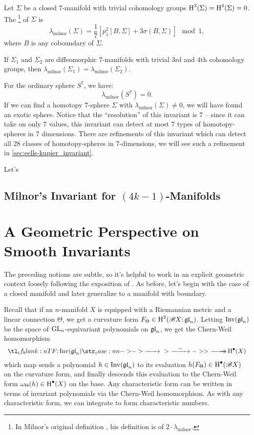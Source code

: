 \begin{definition}
  Let $\Sigma$ be a closed $7$-manifold with trivial cohomology groups $\operatorname{H}^3(\Sigma)=\operatorname{H}^4(\Sigma)=0$. The \footnote{In Milnor's original definition \cite{milnor1956manifolds}, his definition is of $2\cdot \lambda_{\textrm{milnor}}$.} of $\Sigma$ is
  \[
    \lambda_{\mathrm{milnor}}(\Sigma) = \frac{1}{7}\left[p_1^2[B,\Sigma] + 3\sigma(B,\Sigma)\right]\mod 1,
  \]
  where $B$ is any coboundary of $\Sigma$.
\end{definition}

\begin{proposition}
  If $\Sigma_1$ and $\Sigma_2$ are diffeomorphic $7$-manifolds with trivial $3$rd and $4$th cohomology groups, then $\lambda_{\mathrm{milnor}}(\Sigma_1) = \lambda_{\mathrm{milnor}}(\Sigma_2)$.
\end{proposition}

For the ordinary sphere $S^7$, we have:
\[
    \lambda_{\textrm{milnor}}(S^7)=0.
\]
If we can find a homotopy $7$-sphere $\Sigma$ with $\lambda_{\textrm{milnor}}(\Sigma)\neq 0$, we will have found an exotic sphere. Notice that the ``resolution'' of this invariant is $7$ -- since it can take on only $7$ values, this invariant can detect at most $7$ types of homotopy-spheres in $7$ dimensions. There are refinements of this invariant which can detect all $28$ classes of homotopy-spheres in $7$-dimensions, we will see such a refinement in \cref{sec:eells-kupier_invariant}.

Let's 

\subsection*{Milnor's Invariant for $(4k-1)$-Manifolds}

\section{A Geometric Perspective on Smooth Invariants}

The preceding notions are subtle, so it's helpful to work in an explicit geometric context loosely following the exposition of \cite{witten1985global}. As before, let's begin with the case of a closed manifold and later generalize to a manifold with boundary.

Recall that if an $n$-manifold $X$ is equipped with a Riemannian metric and a linear connection $\Theta$, we get a curvature form $F_\Theta\in \operatorname{H}^2(\mathscr{B} X; \mathfrak{gl}_n)$. Letting $\operatorname{\operatorname{Inv}}(\mathfrak{gl}_n)$ be the space of ${\operatorname{GL}}_n$-equivariant polynomials on $\mathfrak{gl}_n$, we get the Chern-Weil homomorphism
\[
	\lkxfunc{}{\Inv(\gl_n)}{\H^\bullet(X)}
\]
which map sends a polynomial $h\in \operatorname{\operatorname{Inv}}(\mathfrak{gl}_n)$ to its evaluation $h(F_\Theta)\in \operatorname{H}^\bullet(\mathscr{B} X)$ on the curvature form, and finally descends this evaluation to the Chern-Weil form $\omega_\Theta(h) \in \operatorname{H}^\bullet(X)$ on the base. Any characteristic form can be written in terms of invariant polynomials via the Chern-Weil homomorphism. As with any characteristic form, we can integrate to form characteristic numbers.


